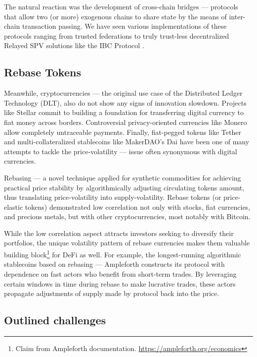 \documentclass{article}
\begin{document}
The natural reaction was the development of cross-chain bridges --- protocols that allow two (or more) exogenous chains to share state by the means of inter-chain transaction passing. We have seen various implementations of these protocols ranging from trusted federations to truly trust-less decentralized Relayed SPV solutions like the IBC Protocol \cite{goes2020ibc}.

\subsection{Rebase Tokens}

Meanwhile, cryptocurrencies --- the original use case of the Distributed Ledger Technology (DLT), also do not show any signs of innovation slowdown. Projects like Stellar \cite{mazieres2016stellar} commit to building a foundation for transferring digital currency to fiat money across borders. Controversial privacy-oriented currencies like Monero \cite{saberhagen2013monero} allow completely untraceable payments. Finally, fiat-pegged tokens like Tether \cite{tether2016} and multi-collateralized stablecoins like MakerDAO's Dai \cite{makerdao2020dai} have been one of many attempts to tackle the price-volatility --- issue often synonymous with digital currencies.

Rebasing --- a novel technique applied for synthetic commodities for achieving practical price stability by algorithmically adjusting circulating tokens amount, thus translating price-volatility into supply-volatility. Rebase tokens (or price-elastic tokens) demonstrated low correlation not only with stocks, fiat currencies, and precious metals, but with other cryptocurrencies, most notably with Bitcoin.

While the low correlation aspect attracts investors seeking to diversify their portfolios, the unique volatility pattern of rebase currencies makes them valuable building block\footnote{Claim from Ampleforth documentation. \url{https://ampleforth.org/economics}} for DeFi as well. For example, the longest-running algorithmic stablecoins based on rebasing --- Ampleforth \cite{kuo2019ampleforth} constructs its protocol with dependence on fast actors who benefit from short-term trades. By leveraging certain windows in time during rebase to make lucrative trades, these actors propagate adjustments of supply made by protocol back into the price.

\subsection{Outlined challenges}
\end{document}
